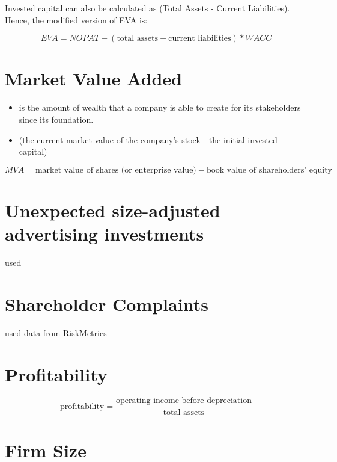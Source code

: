 \documentclass[
]{book}
\providecommand{\tightlist}{%
  \setlength{\itemsep}{0pt}\setlength{\parskip}{0pt}}
\begin{document}
Invested capital can also be calculated as (Total Assets - Current Liabilities). Hence, the modified version of EVA is:

\[
EVA = NOPAT - (\text{total assets} - \text{current liabilities}) * WACC
\]

\hypertarget{market-value-added}{%
\section{Market Value Added}\label{market-value-added}}

\begin{itemize}
\tightlist
\item
  is the amount of wealth that a company is able to create for its stakeholders since its foundation.
\item
  (the current market value of the company's stock - the initial invested capital)
\end{itemize}

\[
MVA = \text{market value of shares (or enterprise value)} - \text{book value of shareholders' equity}
\]

\hypertarget{unexpected-size-adjusted-advertising-investments}{%
\section{Unexpected size-adjusted advertising investments}\label{unexpected-size-adjusted-advertising-investments}}

\citep{Chakravarty_2016, Kim_2011, Liu_2017} used

\hypertarget{shareholder-complaints}{%
\section{Shareholder Complaints}\label{shareholder-complaints}}

\citep{Wies_2019} used data from RiskMetrics

\hypertarget{profitability}{%
\section{Profitability}\label{profitability}}

\citep{Grewal_2008, McAlister_2016}

\[
\text{profitability} = \frac{\text{operating income before depreciation}}{\text{total assets}}
\]

\hypertarget{firm-size}{%
\section{Firm Size}\label{firm-size}}
\end{document}
